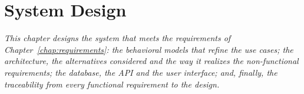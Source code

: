 \chapter{System Design}
\label{chap:system-design}
\textit{This chapter designs the system that meets the requirements of Chapter~\ref{chap:requirements}: the behavioral models that refine the use cases; the architecture, the alternatives considered and the way it realizes the non-functional requirements; the database, the API and the user interface; and, finally, the traceability from every functional requirement to the design.}








